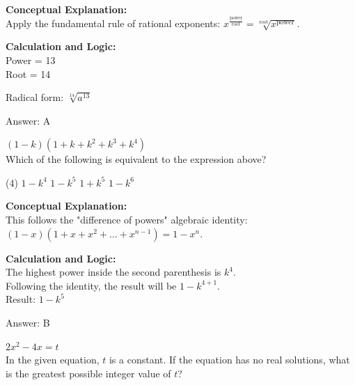 \documentclass[11pt,paper=a4,answers]{exam}
\begin{document}
\begin{questions}
\begin{solution}
\textbf{Conceptual Explanation:} \\
Apply the fundamental rule of rational exponents: $x^{\frac{\text{power}}{\text{root}}} = \sqrt[\text{root}]{x^{\text{power}}}$.

\vspace{20pt}

\textbf{Calculation and Logic:} \\
Power = 13 \\
Root = 14

\vspace{10pt}

Radical form: $\sqrt[14]{a^{13}}$

\vspace{25pt}

Answer: \colorbox{yellow!100}{A}
\end{solution}

\vspace{40pt}

\question
$(1 - k)(1 + k + k^2 + k^3 + k^4)$ \\
Which of the following is equivalent to the expression above?
\begin{tasks}(4)
    \task $1 - k^4$
    \task $1 - k^5$
    \task $1 + k^5$
    \task $1 - k^6$
\end{tasks}

\begin{solution}
\textbf{Conceptual Explanation:} \\
This follows the "difference of powers" algebraic identity: $(1-x)(1 + x + x^2 + ... + x^{n-1}) = 1 - x^n$.

\vspace{20pt}

\textbf{Calculation and Logic:} \\
The highest power inside the second parenthesis is $k^4$. \\
Following the identity, the result will be $1 - k^{4+1}$. \\
Result: $1 - k^5$

\vspace{25pt}

Answer: \colorbox{yellow!100}{B}
\end{solution}

\vspace{40pt}

\question
$2x^2 - 4x = t$ \\
In the given equation, $t$ is a constant. If the equation has no real solutions, what is the greatest possible integer value of $t$?


\end{questions}
\end{document}

